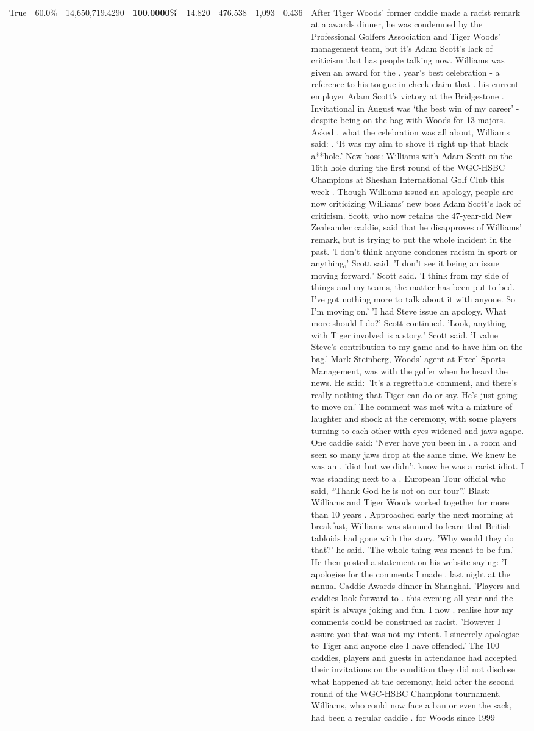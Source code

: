 \begin{table}[H]
\begin{tabular}{lllrlllll}
True & 60.0\% & 14,650,719.4290 & \bfseries \color{red} 100.0000\% & 14.820 & 476.538 & 1,093 & 0.436 & After Tiger Woods' former caddie made a racist remark at a awards dinner, he was condemned by the Professional Golfers Association and Tiger Woods' management team, but it's Adam Scott's lack of criticism that has people talking now. Williams was given an award for the . year’s best celebration - a reference to his tongue-in-cheek claim that . his current employer Adam Scott’s victory at the Bridgestone . Invitational in August was ‘the best win of my career’ - despite being on the bag with Woods for 13 majors. Asked . what the celebration was all about, Williams said: . ‘It was my aim to shove it right up that black a**hole.’ New boss: Williams with Adam Scott  on the 16th hole during the first round of the WGC-HSBC Champions at Sheshan International Golf Club this week . Though Williams issued an apology, people are now criticizing Williams' new boss Adam Scott's lack of criticism. Scott, who now retains the 47-year-old New Zealeander caddie, said that he disapproves of Williams' remark, but is trying to put the whole incident in the past. 'I don't think anyone condones racism in sport or anything,' Scott said. 'I don't see it being an issue moving forward,' Scott said. 'I think from my side of things and my teams, the matter has been put to bed. I've got nothing more to talk about it with anyone. So I'm moving on.' 'I had Steve issue an apology. What more should I do?' Scott continued. 'Look, anything with Tiger involved is a story,' Scott said. 'I value Steve's contribution to my game and to have him on the bag.' Mark Steinberg, Woods' agent at Excel Sports Management, was with the golfer when he heard the news. He said: 'It's a regrettable comment, and there's really nothing that Tiger can do or say. He's just going to move on.' The comment was met with a mixture of laughter and shock at the ceremony, with some players turning to each other with eyes widened and jaws agape. One caddie said: ‘Never have you been in . a room and seen so many jaws drop at the same time. We knew he was an . idiot but we didn’t know he was a racist idiot. I was standing next to a . European Tour official who said, “Thank God he is not on our tour”.’ Blast: Williams and Tiger Woods worked together for more than 10 years . Approached early the next morning at breakfast, Williams was stunned to learn that British tabloids had gone with the story. 'Why would they do that?' he said. 'The whole thing was meant to be fun.' He then posted a statement on his website saying: 'I apologise for the comments I made . last night at the annual Caddie Awards dinner in Shanghai. 'Players and caddies look forward to . this evening all year and the spirit is always joking and fun. I now . realise how my comments could be construed as racist. 'However I assure you that was not my intent. I sincerely apologise to Tiger and anyone else I have offended.' The 100 caddies, players and guests in attendance had accepted their invitations on the condition they did not disclose what happened at the ceremony, held after the second round of the WGC-HSBC Champions tournament. Williams, who could now face a ban or even the sack, had been a regular caddie . for Woods since 1999 
\end{tabular}
\end{table}
